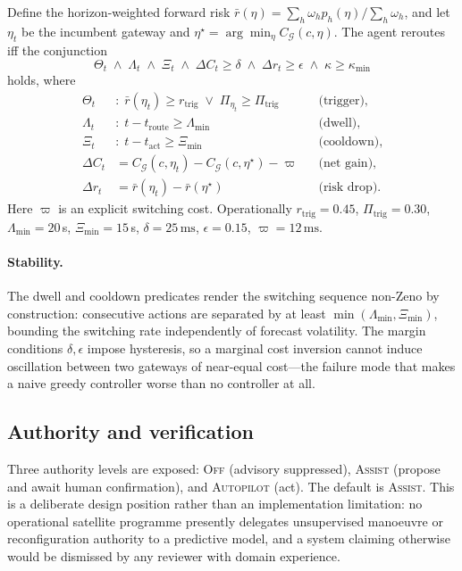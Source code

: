 \documentclass[10pt,twocolumn]{article}
\newcommand{\ms}{\,\mathrm{ms}}
\newcommand{\Gset}{\mathcal{G}}
\begin{document}
Define the horizon-weighted forward risk
$\bar{r}(\eta)=\sum_{h}\omega_{h}p_{h}(\eta)\big/\sum_{h}\omega_{h}$, and let
$\eta_{t}$ be the incumbent gateway and
$\eta^{\star}=\arg\min_{\eta}C_{\Gset}(c,\eta)$. The agent reroutes iff the
conjunction
\begin{equation}
\Theta_{t} \;\wedge\;
\Lambda_{t} \;\wedge\;
\Xi_{t} \;\wedge\;
\Delta C_{t}\ge\delta \;\wedge\;
\Delta r_{t}\ge\epsilon \;\wedge\;
\kappa\ge\kappa_{\min}
\label{eq:gate}
\end{equation}
holds, where
\begin{align}
\Theta_{t} &: \;\bar{r}(\eta_{t})\ge r_{\mathrm{trig}} \;\vee\; \Pi_{\eta_{t}}\ge\Pi_{\mathrm{trig}}
&&\text{(trigger)}, \nonumber\\
\Lambda_{t} &: \; t-t_{\mathrm{route}} \ge \Lambda_{\min}
&&\text{(dwell)}, \nonumber\\
\Xi_{t} &: \; t-t_{\mathrm{act}} \ge \Xi_{\min}
&&\text{(cooldown)}, \nonumber\\
\Delta C_{t} &= C_{\Gset}(c,\eta_{t})-C_{\Gset}(c,\eta^{\star})-\varpi
&&\text{(net gain)}, \nonumber\\
\Delta r_{t} &= \bar{r}(\eta_{t})-\bar{r}(\eta^{\star})
&&\text{(risk drop)}. \nonumber
\end{align}
Here $\varpi$ is an explicit switching cost. Operationally
$r_{\mathrm{trig}}=0.45$, $\Pi_{\mathrm{trig}}=0.30$,
$\Lambda_{\min}=20\,$s, $\Xi_{\min}=15\,$s, $\delta=25\ms$, $\epsilon=0.15$,
$\varpi=12\ms$.

\paragraph{Stability.} The dwell and cooldown predicates render the switching
sequence non-Zeno by construction: consecutive actions are separated by at least
$\min(\Lambda_{\min},\Xi_{\min})$, bounding the switching rate independently of
forecast volatility. The margin conditions $\delta,\epsilon$ impose hysteresis,
so a marginal cost inversion cannot induce oscillation between two gateways of
near-equal cost---the failure mode that makes a naive greedy controller worse
than no controller at all.

\subsection{Authority and verification}

Three authority levels are exposed: \textsc{Off} (advisory suppressed),
\textsc{Assist} (propose and await human confirmation), and \textsc{Autopilot}
(act). The default is \textsc{Assist}. This is a deliberate design position
rather than an implementation limitation: no operational satellite programme
presently delegates unsupervised manoeuvre or reconfiguration authority to a
predictive model, and a system claiming otherwise would be dismissed by any
reviewer with domain experience.
\end{document}

